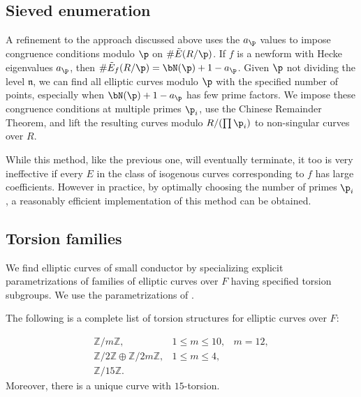 \documentclass{amsart}
\newcommand{\n}{\mathfrak{n}}
\begin{document}
\subsection{Sieved enumeration}\label{sec:sieve}

A refinement to the approach discussed above uses the $a_\p$ values to impose
congruence conditions modulo $\p$ on $\#\tilde E(R/\p)$.
If $f$ is a newform with Hecke eigenvalues
$a_\p$, then $\#\tilde E_f(R/\p)=\bN(\p)+1-a_{\p}$.
Given $\p$ not dividing the level $\n$, we can find all elliptic curves
modulo $\p$ with the specified number of points, especially when $\bN(\p) +1 - a_\p$ has
few prime factors. We impose these congruence conditions at multiple primes $\p_i$,
use the Chinese Remainder Theorem, and lift the resulting curves modulo $R/ (\prod \p_i)$
to non-singular curves over $R$.

While this method, like the previous one, will eventually terminate, it too is very
ineffective if every $E$ in the class of isogenous curves corresponding to $f$ has
large coefficients. However in practice, by optimally choosing the number of primes $\p_i$, 
a reasonably efficient implementation of this method can be obtained.

\subsection{Torsion families}\label{sec:torsion}
We find elliptic curves of small conductor by specializing explicit parametrizations
of families of elliptic curves over $F$ having specified torsion subgroups.
We use the parametrizations of \cite{kubert:torfam}.

\begin{theorem} The following is
a complete list of torsion structures for elliptic curves over $F$:

$$\begin{array}{lll}
\mathbb{Z}/m\mathbb{Z},   &1 \leq m \leq 10,& m = 12,\\
\mathbb{Z}/2\mathbb{Z} \oplus \mathbb{Z}/2m\mathbb{Z}, &  1 \leq m \leq 4,&\\
\mathbb{Z}/15\mathbb{Z}.&&
\end{array}$$ 
Moreover, there is a unique curve with $15$-torsion.
\end{theorem}
\end{document}
